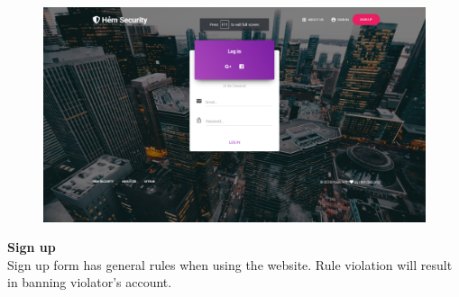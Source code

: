 \begin{figure}[!htb]
\endminipage\hfill
{}
  \includegraphics[width=\linewidth]{images/chap4/signin.png}
\endminipage
\end{figure}
\cleardoublepage
\textbf{Sign up}
\\
Sign up form has general rules when using the website. Rule violation will result in banning violator's account.
